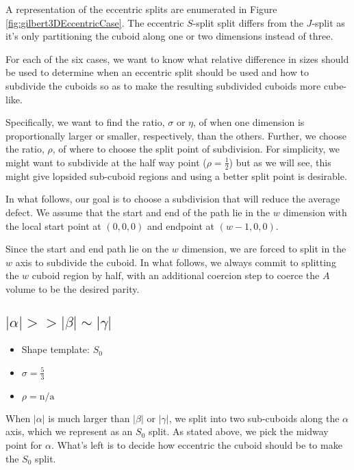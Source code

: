 A representation of the eccentric splits are enumerated in Figure \ref{fig:gilbert3DEccentricCase}.
The eccentric $S$-split split differs from the $J$-split as it's only partitioning the cuboid along
one or two dimensions instead of three.

For each of the six cases, we want to know what relative difference in sizes should be used
to determine when an eccentric split should be used and how to subdivide the cuboids so as to make
the resulting subdivided cuboids more cube-like.

Specifically, we want to find the ratio, $\sigma$ or $\eta$, of when one dimension is proportionally larger or smaller,
respectively, than the others.
Further, we choose the ratio, $\rho$, of where to choose the split point of subdivision.
For simplicity, we might want to subdivide at the half way point ($\rho = \frac{1}{2}$) but as we
will see, this might give lopsided sub-cuboid regions and using a better split point is desirable.

In what follows, our goal is to choose a subdivision that will reduce the average defect.
We assume that the start and end of the path lie in the $w$ dimension with the local start point at $(0,0,0)$
and endpoint at $(w-1,0,0)$.

Since the start and end path lie on the $w$ dimension, we are forced to split in the $w$ axis
to subdivide the cuboid.
In what follows, we always commit to splitting the $w$ cuboid region by half, with an
additional coercion step to coerce the $A$ volume to be the desired parity.


\subsection{$|\alpha| >> |\beta| \sim |\gamma|$}

\begin{itemize}
  \item Shape template: $S_0$
  \item $\sigma = \frac{5}{3}$
  \item $\rho = \text{n/a}$
\end{itemize}


When $|\alpha|$ is much larger than $|\beta|$ or $|\gamma|$,
we split into two sub-cuboids along the $\alpha$ axis,
which we represent as an $S_0$ split.
As stated above, we pick the midway point for $\alpha$.
What's left is to decide how eccentric the cuboid should be to make the $S_0$ split.

